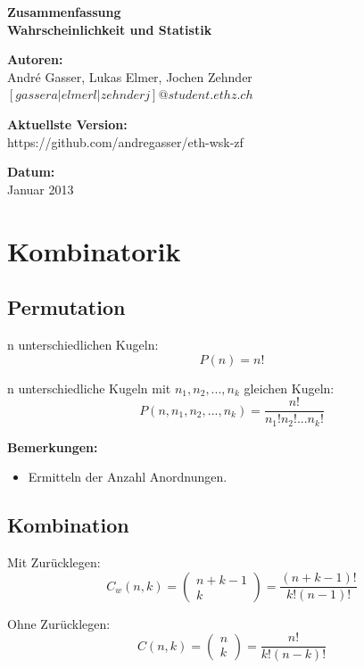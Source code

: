 \documentclass[10pt,a4paper,twocolumn]{article}
\begin{document}
\begin{center}
\textbf{Zusammenfassung\\ Wahrscheinlichkeit und Statistik}

\vspace{10pt}

\textbf{Autoren:} \\
André Gasser, Lukas Elmer, Jochen Zehnder \\
$\left[gassera|elmerl|zehnderj\right]@student.ethz.ch$

\vspace{10pt}

\textbf{Aktuellste Version:} \\
https://github.com/andregasser/eth-wsk-zf

\vspace{10pt}

\textbf{Datum:}\\
Januar 2013
\end{center}

\section{Kombinatorik}

\subsection{Permutation}
n unterschiedlichen Kugeln:
\[
P(n)=n!
\]

n unterschiedliche Kugeln mit $n_1,n_2,...,n_k$ gleichen Kugeln:
\[
P(n,n_1,n_2,...,n_k)=\frac{n!}{n_1!n_2!...n_k!}
\]

\textbf{Bemerkungen:}
\begin{itemize}
\item Ermitteln der Anzahl Anordnungen.
\end{itemize}

\subsection{Kombination}
Mit Zurücklegen:
\[
C_w(n,k)=\left( 
	\begin{array}{c}
		n+k-1 \\
		k
	\end{array}
\right) =
\frac{(n+k-1)!}{k!(n-1)!}
\]

Ohne Zurücklegen:
\[
C(n,k)=\left( 
	\begin{array}{c}
		n \\
		k
	\end{array}
\right) =
\frac{n!}{k!(n-k)!}
\]
\end{document}
